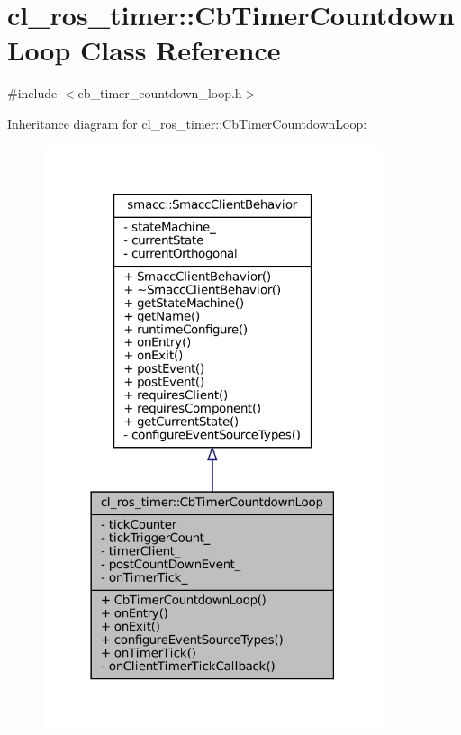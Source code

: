\hypertarget{classcl__ros__timer_1_1CbTimerCountdownLoop}{}\section{cl\+\_\+ros\+\_\+timer\+:\+:Cb\+Timer\+Countdown\+Loop Class Reference}
\label{classcl__ros__timer_1_1CbTimerCountdownLoop}


{\ttfamily \#include $<$cb\+\_\+timer\+\_\+countdown\+\_\+loop.\+h$>$}



Inheritance diagram for cl\+\_\+ros\+\_\+timer\+:\+:Cb\+Timer\+Countdown\+Loop\+:
\nopagebreak
\begin{figure}[H]
\begin{center}
\leavevmode
\includegraphics[width=282pt]{classcl__ros__timer_1_1CbTimerCountdownLoop__inherit__graph}
\end{center}
\end{figure}


